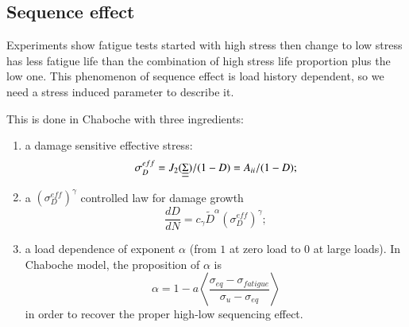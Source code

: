 \documentclass[3p,times,number,review]{elsarticle}
\begin{document}
%
%



\subsection{Sequence effect}

Experiments show fatigue tests started with high stress then change to low stress has less fatigue life than the combination of high stress life proportion plus the low one. This phenomenon of sequence effect is load history dependent, so we need a stress induced parameter to describe it. 

This is done in Chaboche  with three ingredients:

\begin{enumerate} 
\vspace{6pt}
\item a damage sensitive effective stress: 
$$\sigma_D^{eff} = J_2(\uline{\uline{\Sigma}})/(1-D)={A}_{\uppercase\expandafter{\romannumeral2}}/(1-D);$$

\vspace{6pt}

\item a $(\sigma_D^{eff})^\gamma$ controlled  law for damage growth
$$\dfrac{dD}{dN} =c_\gamma {\tilde{D}}^\alpha (\sigma_D^{eff})^\gamma;$$

\vspace{6pt}

\item  a load dependence of exponent $\alpha$ (from $1$ at zero load to $0$ at large loads). In Chaboche model, the proposition of $\alpha$ is
\begin{equation}
\alpha = 1 - a\left\langle \frac{ \sigma_{eq}-\sigma_{fatigue}}{ \sigma_{u} - \sigma_{eq}}\right\rangle
\end{equation}
in order to recover the proper high-low sequencing effect.
\end{enumerate}
\end{document}
